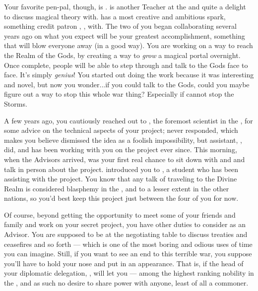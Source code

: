 \documentclass[char]{GL2020}
\begin{document}
Your favorite pen-pal, though, is \cFlowPriest{\full}. \cFlowPriest{} is another Teacher at the \pSchool{} and quite a delight to discuss magical theory with. \cFlowPriest{} has a most creative and ambitious spark, something \cFlowPriest{\they} credit\cFlowPriest{\verbs} \cFlowPriest{\their} patron \cFlow{\God}, \cFlowFull{\full}, with. The two of you began collaborating several years ago on what you expect will be your greatest accomplishment, something that will blow everyone away (in a good way). You are working on a way to reach the Realm of the Gods, by creating a way to \emph{grow} a magical portal overnight. Once complete, people will be able to step through and talk to the Gods face to face. It's simply \emph{genius}! You started out doing the work because it was interesting and novel, but now you wonder...if you could talk to the Gods, could you maybe figure out a way to stop this whole war thing? Especially if \pTech{} cannot stop the Storms.

A few years ago, you cautiously reached out to \cHeadScientist{\full}, the foremost scientist in the \pTech{}, for some advice on the technical aspects of your project; \cHeadScientist{\they} never responded, which makes you believe \cHeadScientist{\they} dismissed the idea as a foolish impossibility, but \cHeadScientist{\their} assistant, \cAssistantScientist{\full}, did, and \cAssistantScientist{\they} has been working with you on the project ever since. This morning, when the Advisors arrived, was your first real chance to sit down with \cFlowPriest{} and \cAssistantScientist{} and talk in person about the project. \cFlowPriest{\They} introduced you to \cAmbition{\full}, a student who has been assisting \cFlowPriest{\them} with the project. You know that any talk of traveling to the Divine Realm is considered blasphemy in the \pFarm{}, and to a lesser extent in the other nations, so you'd best keep this project just between the four of you for now.

Of course, beyond getting the opportunity to meet some of your friends and family and work on your secret project, you have other duties to consider as an Advisor. You are supposed to be at the negotiating table to discuss treaties and ceasefires and so forth — which is one of the most boring and odious uses of time you can imagine. Still, if you want to see an end to this terrible war, you suppose you'll have to hold your nose and put in an appearance. That is, if the head of your diplomatic delegation, \cEvil{\full}, will let you — \cEvil{\they} \cEvil{\are} among the highest ranking nobility in the \pFarm{}, and as such \cEvil{\have} no desire to share power with anyone, least of all a commoner. 
\end{document}

